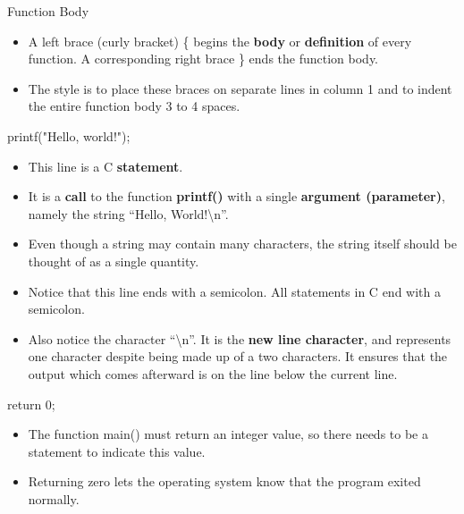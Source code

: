 \documentclass[graphics]{beamer}
\begin{document}
\begin{frame}{Function Body}
    \begin{itemize}
        \item A left brace (curly bracket) \{ begins the \textbf{body} or \textbf{definition} of every function.  A corresponding right brace \} ends the function body.
        \item The style is to place these braces on separate lines in column 1 and to indent the entire function body 3 to 4 spaces.
    \end{itemize}
\end{frame}

\begin{frame}{printf("Hello, world!\n");}
    \begin{itemize}
        \item This line is a C \textbf{statement}.
        \item It is a \textbf{call} to the function \textbf{printf()} with a single \textbf{argument (parameter)}, namely the string ``Hello, World!\textbackslash n''.
        \item Even though a string may contain many characters, the string itself should be thought of as a single quantity.
        \item Notice that this line ends with a semicolon. All statements in C end with a semicolon.
        \item Also notice the character ``\textbackslash n''. It is the \textbf{new line character}, and represents one character despite being made up of a two characters. It ensures that the output which comes afterward is on the line below the current line.
    \end{itemize}
\end{frame}

\begin{frame}{return 0;}
    \begin{itemize}
        \item The function main() must return an integer value, so there needs to be a statement to indicate this value.
        \item Returning zero lets the operating system know that the program exited normally.
    \end{itemize}
\end{frame}
\end{document}
